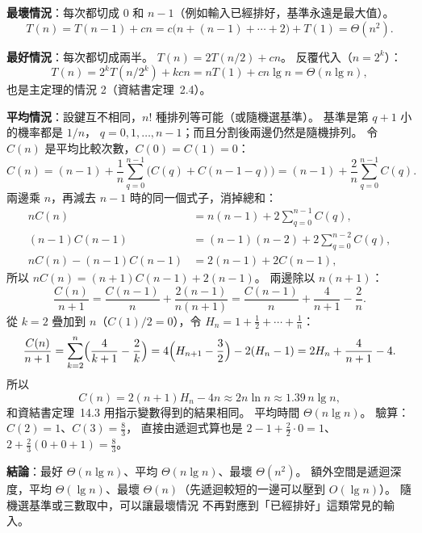 \begin{pastsoln}
\textbf{最壞情況}：每次都切成 $0$ 和 $n - 1$（例如輸入已經排好，基準永遠是最大值）。
\[
T(n) = T(n - 1) + cn = c\bigl(n + (n-1) + \cdots + 2\bigr) + T(1) = \Theta(n^2).
\]

\textbf{最好情況}：每次都切成兩半。 $T(n) = 2T(n/2) + cn$。 反覆代入（$n = 2^k$）：
\[
T(n) = 2^k T(n/2^k) + kcn = nT(1) + cn\lg n = \Theta(n \lg n),
\]
也是主定理的情況 2（資結書定理~2.4）。

\textbf{平均情況}：設鍵互不相同，$n!$ 種排列等可能（或隨機選基準）。 基準是第 $q + 1$ 小的機率都是 $1/n$，
$q = 0, 1, \ldots, n-1$；而且分割後兩邊仍然是隨機排列。 令 $C(n)$ 是平均比較次數，$C(0) = C(1) = 0$：
\[
C(n) = (n - 1) + \frac{1}{n}\sum_{q=0}^{n-1} \bigl(C(q) + C(n-1-q)\bigr) = (n - 1) + \frac{2}{n}\sum_{q=0}^{n-1} C(q).
\]
兩邊乘 $n$，再減去 $n - 1$ 時的同一個式子，消掉總和：
\begin{align*}
nC(n) &= n(n-1) + 2\sum_{q=0}^{n-1} C(q),\\
(n-1)C(n-1) &= (n-1)(n-2) + 2\sum_{q=0}^{n-2} C(q),\\
nC(n) - (n-1)C(n-1) &= 2(n-1) + 2C(n-1),
\end{align*}
所以 $nC(n) = (n+1)C(n-1) + 2(n-1)$。 兩邊除以 $n(n+1)$：
\[
\frac{C(n)}{n+1} = \frac{C(n-1)}{n} + \frac{2(n-1)}{n(n+1)} = \frac{C(n-1)}{n} + \frac{4}{n+1} - \frac{2}{n}.
\]
從 $k = 2$ 疊加到 $n$（$C(1)/2 = 0$），令 $H_n = 1 + \frac12 + \cdots + \frac1n$：
\[
\frac{C(n)}{n+1} = \sum_{k=2}^{n}\Bigl(\frac{4}{k+1} - \frac{2}{k}\Bigr) = 4\Bigl(H_{n+1} - \frac32\Bigr) - 2(H_n - 1)
= 2H_n + \frac{4}{n+1} - 4 .
\]
所以
\[
C(n) = 2(n+1)H_n - 4n \approx 2n\ln n \approx 1.39\, n\lg n,
\]
和資結書定理~14.3 用指示變數得到的結果相同。 平均時間 $\Theta(n \lg n)$。 驗算：$C(2) = 1$、$C(3) = \frac{8}{3}$，
直接由遞迴式算也是 $2 - 1 + \frac{2}{2}\cdot 0 = 1$、$2 + \frac{2}{3}(0 + 0 + 1) = \frac{8}{3}$。

\textbf{結論}：最好 $\Theta(n \lg n)$、平均 $\Theta(n \lg n)$、最壞 $\Theta(n^2)$。 額外空間是遞迴深度，平均
$\Theta(\lg n)$、最壞 $\Theta(n)$（先遞迴較短的一邊可以壓到 $O(\lg n)$）。 隨機選基準或三數取中，可以讓最壞情況
不再對應到「已經排好」這類常見的輸入。
\end{pastsoln}
